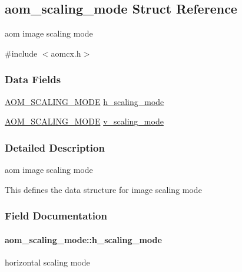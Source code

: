 \hypertarget{structaom__scaling__mode}{}\subsection{aom\+\_\+scaling\+\_\+mode Struct Reference}
\label{structaom__scaling__mode}


aom image scaling mode  




{\ttfamily \#include $<$aomcx.\+h$>$}

\subsubsection*{Data Fields}
\begin{DoxyCompactItemize}
\item 
\hyperlink{group__aom__encoder_ga6694eedd50b128415a3434404c56d73d}{A\+O\+M\+\_\+\+S\+C\+A\+L\+I\+N\+G\+\_\+\+M\+O\+DE} \hyperlink{structaom__scaling__mode_aa5ea6cc798f31d2af5e68425982f50e5}{h\+\_\+scaling\+\_\+mode}
\item 
\hyperlink{group__aom__encoder_ga6694eedd50b128415a3434404c56d73d}{A\+O\+M\+\_\+\+S\+C\+A\+L\+I\+N\+G\+\_\+\+M\+O\+DE} \hyperlink{structaom__scaling__mode_a3b535e8839e2bdf05afcd15ec6daa6ce}{v\+\_\+scaling\+\_\+mode}
\end{DoxyCompactItemize}


\subsubsection{Detailed Description}
aom image scaling mode 

This defines the data structure for image scaling mode 

\subsubsection{Field Documentation}
\paragraph[{\texorpdfstring{h\+\_\+scaling\+\_\+mode}{h_scaling_mode}}]{ aom\+\_\+scaling\+\_\+mode\+::h\+\_\+scaling\+\_\+mode}\hypertarget{structaom__scaling__mode_aa5ea6cc798f31d2af5e68425982f50e5}{}\label{structaom__scaling__mode_aa5ea6cc798f31d2af5e68425982f50e5}
horizontal scaling mode 
